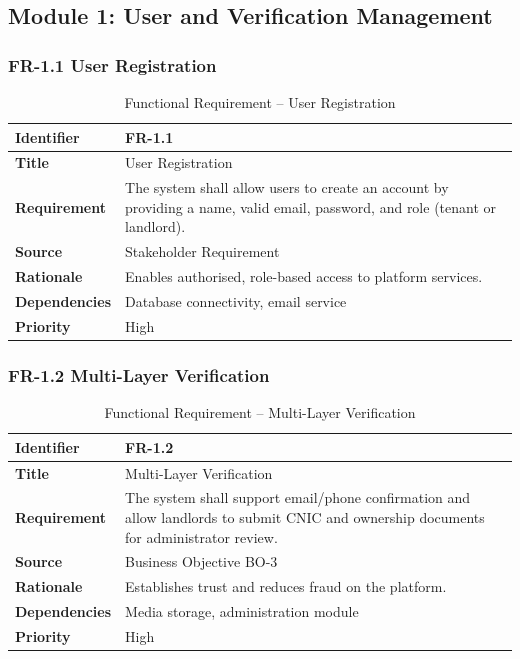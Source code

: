 \subsection{Module 1: User and Verification Management}

\subsubsection{FR-1.1 User Registration}

\begin{table}[h]
\centering
\caption{Functional Requirement -- User Registration}

\begin{tabularx}{\textwidth}{|>{\raggedright\arraybackslash}p{3cm}|X|}
\hline
\textbf{Identifier} & FR-1.1 \\
\hline
\textbf{Title} & User Registration \\
\hline
\textbf{Requirement} & The system shall allow users to create an account by providing a name, valid email, password, and role (tenant or landlord). \\
\hline
\textbf{Source} & Stakeholder Requirement \\
\hline
\textbf{Rationale} & Enables authorised, role-based access to platform services. \\
\hline
\textbf{Dependencies} & Database connectivity, email service \\
\hline
\textbf{Priority} & High \\
\hline
\end{tabularx}

\end{table}

\subsubsection{FR-1.2 Multi-Layer Verification}

\begin{table}[h]
\centering
\caption{Functional Requirement -- Multi-Layer Verification}

\begin{tabularx}{\textwidth}{|>{\raggedright\arraybackslash}p{3cm}|X|}
\hline
\textbf{Identifier} & FR-1.2 \\
\hline
\textbf{Title} & Multi-Layer Verification \\
\hline
\textbf{Requirement} & The system shall support email/phone confirmation and allow landlords to submit CNIC and ownership documents for administrator review. \\
\hline
\textbf{Source} & Business Objective BO-3 \\
\hline
\textbf{Rationale} & Establishes trust and reduces fraud on the platform. \\
\hline
\textbf{Dependencies} & Media storage, administration module \\
\hline
\textbf{Priority} & High \\
\hline
\end{tabularx}

\end{table}

